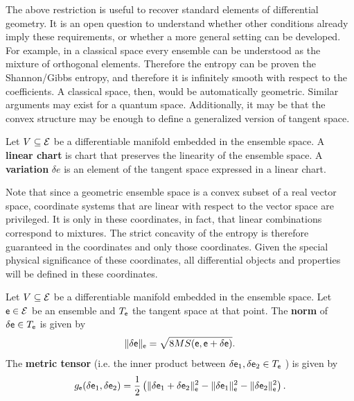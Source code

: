 \begin{remark}
	The above restriction is useful to recover standard elements of differential geometry. It is an open question to understand whether other conditions already imply these requirements, or whether a more general setting can be developed. For example, in a classical space every ensemble can be understood as the mixture of orthogonal elements. Therefore the entropy can be proven the Shannon/Gibbs entropy, and therefore it is infinitely smooth with respect to the coefficients. A classical space, then, would be automatically geometric. Similar arguments may exist for a quantum space. Additionally, it may be that the convex structure may be enough to define a generalized version of tangent space.
\end{remark}

\begin{defn}
	Let $V \subseteq \mathcal{E}$ be a differentiable manifold embedded in the ensemble space. A \textbf{linear chart} is chart that preserves the linearity of the ensemble space. A \textbf{variation} $\delta e$ is an element of the tangent space expressed in a linear chart.
\end{defn}

\begin{remark}
	Note that since a geometric ensemble space is a convex subset of a real vector space, coordinate systems that are linear with respect to the vector space are privileged. It is only in these coordinates, in fact, that linear combinations correspond to mixtures. The strict concavity of the entropy is therefore guaranteed in the coordinates and only those coordinates. Given the special physical significance of these coordinates, all differential objects and properties will be defined in these coordinates.
\end{remark}

\begin{defn}
	Let $V \subseteq \mathcal{E}$ be a differentiable manifold embedded in the ensemble space. Let $\mathsf{e} \in \mathcal{E}$ be an ensemble and $T_{\mathsf{e}}$ the tangent space at that point. The \textbf{norm} of $\delta \mathsf{e} \in T_{\mathsf{e}}$ is given by
	$$ \lVert \delta \mathsf{e} \rVert_{\mathsf{e}} = \sqrt{ 8 MS(\mathsf{e}, \mathsf{e} + \delta \mathsf{e}) }.$$
	The \textbf{metric tensor} (i.e. the inner product between $\delta \mathsf{e}_1 , \delta \mathsf{e}_2 \in T_{\mathsf{e}}$ ) is given by
	$$ g_{\mathsf{e}}( \delta \mathsf{e}_1, \delta \mathsf{e}_2 ) = \frac{1}{2} \left( \lVert \delta \mathsf{e}_1 + \delta \mathsf{e}_2 \rVert_{\mathsf{e}}^2 - \lVert \delta \mathsf{e}_1 \rVert_{\mathsf{e}}^2 - \lVert \delta \mathsf{e}_2 \rVert_{\mathsf{e}}^2 \right).$$
\end{defn}

